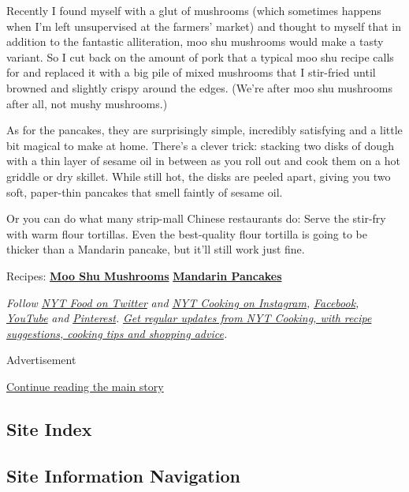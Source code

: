Recently I found myself with a glut of mushrooms (which sometimes
happens when I'm left unsupervised at the farmers' market) and thought
to myself that in addition to the fantastic alliteration, moo shu
mushrooms would make a tasty variant. So I cut back on the amount of
pork that a typical moo shu recipe calls for and replaced it with a big
pile of mixed mushrooms that I stir-fried until browned and slightly
crispy around the edges. (We're after moo shu mushrooms after all, not
mushy mushrooms.)

As for the pancakes, they are surprisingly simple, incredibly satisfying
and a little bit magical to make at home. There's a clever trick:
stacking two disks of dough with a thin layer of sesame oil in between
as you roll out and cook them on a hot griddle or dry skillet. While
still hot, the disks are peeled apart, giving you two soft, paper-thin
pancakes that smell faintly of sesame oil.

Or you can do what many strip-mall Chinese restaurants do: Serve the
stir-fry with warm flour tortillas. Even the best-quality flour tortilla
is going to be thicker than a Mandarin pancake, but it'll still work
just fine.

Recipes:
\textbf{\href{https://cooking.nytimes3xbfgragh.onion/recipes/1020817-moo-shu-mushrooms}{Moo
Shu Mushrooms}} \textbar{}
\textbf{\href{https://cooking.nytimes3xbfgragh.onion/recipes/1020819-mandarin-pancakes}{Mandarin
Pancakes}}

\emph{Follow} \href{https://twitter.com/nytfood}{\emph{NYT Food on
Twitter}} \emph{and}
\href{https://www.instagram.com/nytcooking/}{\emph{NYT Cooking on
Instagram}}\emph{,}
\href{https://www.facebookcorewwwi.onion/nytcooking/}{\emph{Facebook}}\emph{,}
\href{https://www.youtube.com/nytcooking}{\emph{YouTube}} \emph{and}
\href{https://www.pinterest.com/nytcooking/}{\emph{Pinterest}}\emph{.}
\href{https://www.nytimes3xbfgragh.onion/newsletters/cooking}{\emph{Get
regular updates from NYT Cooking, with recipe suggestions, cooking tips
and shopping advice}}\emph{.}

Advertisement

\protect\hyperlink{after-bottom}{Continue reading the main story}

\hypertarget{site-index}{%
\subsection{Site Index}\label{site-index}}

\hypertarget{site-information-navigation}{%
\subsection{Site Information
Navigation}\label{site-information-navigation}}


